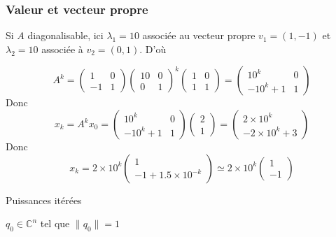 \documentclass{beamer}
\newenvironment{algo}{
\begin{algorithm}[H]
\DontPrintSemicolon \SetAlgoVlined}
{\end{algorithm}}
\begin{document}
\begin{frame}
\frametitle{Valeur et vecteur propre}
Si $A$ diagonalisable, 
ici $\lambda_1=10$ associée au vecteur propre $v_1=(1,-1)$ et $\lambda_2=10$ associée à $v_2=(0,1)$.
D'où

\[A^k=\left(\begin{array}{cc}
1&0\\
-1&1
\end{array}\right)
\left(\begin{array}{cc}
10&0\\
0&1
\end{array}\right)^k
\left(\begin{array}{cc}
1&0\\
1&1
\end{array}\right)
= \left(\begin{array}{cc}
10^k&0\\
-10^k+1&1
\end{array}\right)\]
Donc
\[x_k=A^kx_0= \left(\begin{array}{cc}
10^k&0\\
-10^k+1&1
\end{array}\right)\left(\begin{array}{c}
2\\
1
\end{array}\right)=\left(\begin{array}{c}
2\times 10^k\\
-2\times 10^k+3
\end{array}\right)\]
Donc
\[x_k=2\times 10^k\left(\begin{array}{c}
1\\
-1+1.5\times 10^{-k}
\end{array}\right)\simeq 2\times 10^k\left(\begin{array}{c}
1\\
-1
\end{array}\right)
\]
\end{frame}

\begin{frame}

\begin{algo}
\caption{Puissances itérées}
$q_0\in\mathbb{C}^n $ tel que $\|q_0\|=1$\;

\end{algo}
\end{frame}
\end{document}

